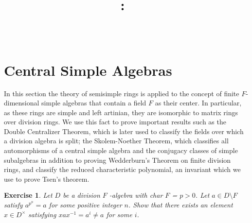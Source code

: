 \documentclass{article}
\title{
    \vspace{2in}
    \textmd{\textbf{\hmwkClass:\ \hmwkTitle}}\\
    \vspace{0.3in}\large{\textit{\hmwkClassInstructor\  }}
    \vspace{2in}
}
\author{\hmwkAuthorName}
\date{}
\newtheorem{exercise}{Exercise}[section]
\begin{document}
\maketitle

\pagebreak

\section{Central Simple Algebras}

In this section the theory of semisimple rings is applied to the concept of finite $F$-dimensional simple algebras that contain a field $F$ as their center. In particular, as these rings are simple and left artinian, they are isomorphic to matrix rings over division rings. We use this fact to prove important results such as the Double Centralizer Theorem, which is later used to classify the fields over which a division algebra is split; the Skolem-Noether Theorem, which classifies all automorphisms of a central simple algebra and the conjugacy classes of simple subalgebras in addition to proving Wedderburn's Theorem on finite division rings, and classify the reduced characteristic polynomial, an invariant which we use to prove Tsen's theorem.

\begin{exercise}
Let $D$ be a division $F$ -algebra with char $F$ = $p > 0$. Let $a \in D \setminus F$
satisfy $a^{p^{n}} = a$ for some positive integer $n$. Show that there exists
an element $x \in D^{\times}$ satisfying $xax^{-1} = a^{i} \neq a$ for some $i$.
\end{exercise}
\end{document}
